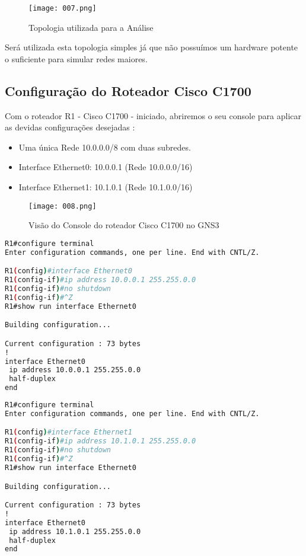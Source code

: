 \begin{figure}[H]
\centering
\texttt{[image: 007.png]}
\caption{Topologia utilizada para a Análise}
\label{Rotulo}
\end{figure}

Será utilizada esta topologia simples já que não possuímos um hardware potente o suficiente para simular redes maiores.

\subsection{Configuração do Roteador Cisco C1700}

Com o roteador R1 - Cisco C1700 - iniciado, abriremos o seu console para aplicar as devidas configurações desejadas\cite{cisco-basic-commands} \cite{freeccnaworkbook}:

\begin{itemize}
  \item Uma única Rede 10.0.0.0/8 com duas subredes.
  \item Interface Ethernet0: 10.0.0.1 (Rede 10.0.0.0/16)
  \item Interface Ethernet1: 10.1.0.1 (Rede 10.1.0.0/16)
\end{itemize}

\begin{figure}[H]
\centering
\texttt{[image: 008.png]}
\caption{Visão do Console do roteador Cisco C1700 no GNS3}
\label{Rotulo}
\end{figure}

\begin{lstlisting}[language=bash]
R1#configure terminal
Enter configuration commands, one per line. End with CNTL/Z.

R1(config)#interface Ethernet0
R1(config-if)#ip address 10.0.0.1 255.255.0.0
R1(config-if)#no shutdown
R1(config-if)#^Z
R1#show run interface Ethernet0

Building configuration...

Current configuration : 73 bytes
!
interface Ethernet0
 ip address 10.0.0.1 255.255.0.0
 half-duplex
end

\end{lstlisting}

\begin{lstlisting}[language=bash]
R1#configure terminal
Enter configuration commands, one per line. End with CNTL/Z.

R1(config)#interface Ethernet1
R1(config-if)#ip address 10.1.0.1 255.255.0.0
R1(config-if)#no shutdown
R1(config-if)#^Z
R1#show run interface Ethernet0

Building configuration...

Current configuration : 73 bytes
!
interface Ethernet0
 ip address 10.1.0.1 255.255.0.0
 half-duplex
end

\end{lstlisting}

